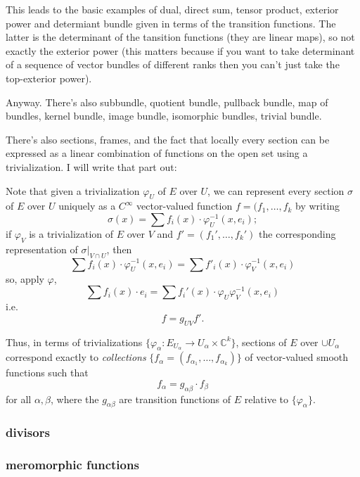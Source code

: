 \begin{enumerate}
This leads to the basic examples of dual, direct sum, tensor product, exterior power and determiant bundle given in terms of the transition functions. The latter is the determinant of the tansition functions (they are linear maps), so not exactly the exterior power (this matters because if you want to take determinant of a sequence of vector bundles of different ranks then you can't just take the top-exterior power). 

Anyway. There's also subbundle, quotient bundle, pullback bundle, map of bundles, kernel bundle, image bundle, isomorphic bundles, trivial bundle.

There's also sections, frames, and the fact that locally every section can be expressed as a linear combination of functions on the open set using a trivialization. I will write that part out:

Note that given a trivialization \(\varphi_{U}\) of \(E\) over \(U\), we can represent every section \(\sigma\) of \(E\) over \(U\) uniquely as a \(C^\infty\) vector-valued function \(f=(f_1,\ldots,f_k\) by writing
\[\sigma(x)= \sum f_i(x) \cdot \varphi_U^{-1}(x,e_i);\]
if  \(\varphi_V\) is a trivialization of \(E\) over \(V\) and \(f'=(f_1',\ldots,f_k')\) the corresponding representation of  \(\sigma|_{V \cap U}\), then
\[\sum f_i(x) \cdot \varphi_U^{-1}(x,e_i)=\sum f'_i(x)\cdot \varphi_V^{-1}(x,e_i)\]
so, apply \(\varphi\),
\[\sum f_i(x)\cdot e_i=\sum f_i'(x) \cdot \varphi_U \varphi_V^{-1}(x,e_i)\]
i.e.
\[f=g_{UV}f'.\]
\begin{tcolorbox}[colback=white,colframe=black,boxrule=0.5pt,sharp corners]
Thus, in terms of trivializations $\{\varphi_\alpha:E_{U_\alpha}\to U_\alpha\times \mathbb{C}^k\}$, sections of $E$ over $\cup U_\alpha$ correspond exactly to \textit{collections} $\{f_\alpha=(f_{\alpha_1},\ldots,f_{\alpha_k})\}$ of vector-valued smooth functions such that
\[
f_\alpha=g_{\alpha\beta}\cdot f_\beta
\]
for all $\alpha,\beta$, where the $g_{\alpha\beta}$ are transition functions of $E$ relative to $\{\varphi_\alpha\}$.
\end{tcolorbox}


\end{enumerate}

\subsubsection{divisors}

\subsubsection{meromorphic functions}


